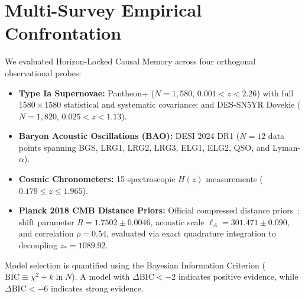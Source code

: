 \documentclass[10pt,twocolumn]{article}
\begin{document}
\section{Multi-Survey Empirical Confrontation}
We evaluated Horizon-Locked Causal Memory across four orthogonal observational probes:
\begin{itemize}
\item \textbf{Type Ia Supernovae:} Pantheon+ ($N=1,580$, $0.001 < z < 2.26$) with full $1580 \times 1580$ statistical and systematic covariance; and DES-SN5YR Dovekie ($N=1,820$, $0.025 < z < 1.13$).
\item \textbf{Baryon Acoustic Oscillations (BAO):} DESI 2024 DR1 ($N=12$ data points spanning BGS, LRG1, LRG2, LRG3, ELG1, ELG2, QSO, and Lyman-$\alpha$).
\item \textbf{Cosmic Chronometers:} 15 spectroscopic $H(z)$ measurements ($0.179 \le z \le 1.965$).
\item \textbf{Planck 2018 CMB Distance Priors:} Official compressed distance priors~\cite{chen2019}: shift parameter $R = 1.7502 \pm 0.0046$, acoustic scale $\ell_A = 301.471 \pm 0.090$, and correlation $\rho = 0.54$, evaluated via exact quadrature integration to decoupling $z_* = 1089.92$.
\end{itemize}

Model selection is quantified using the Bayesian Information Criterion ($\mathrm{BIC} \equiv \chi^2 + k\ln N$). A model with $\Delta\mathrm{BIC} < -2$ indicates positive evidence, while $\Delta\mathrm{BIC} < -6$ indicates strong evidence.
\end{document}
